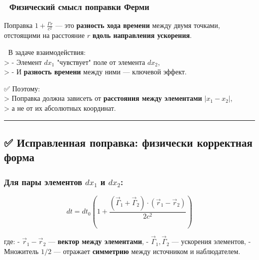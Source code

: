 \documentclass[11pt]{article}
\begin{document}
\subsubsection{🔹 Физический смысл поправки
Ферми}\label{ux444ux438ux437ux438ux447ux435ux441ux43aux438ux439-ux441ux43cux44bux441ux43b-ux43fux43eux43fux440ux430ux432ux43aux438-ux444ux435ux440ux43cux438}

Поправка \(1 + \frac{\Gamma r}{c^2}\) --- это \textbf{разность хода
времени} между двумя точками,\\
отстоящими на расстояние \(r\) \textbf{вдоль направления ускорения}.

📌 В задаче взаимодействия:\\
\textgreater{} - Элемент \(dx_1\) "чувствует" поле от элемента
\(dx_2\),\\
\textgreater{} - И \textbf{разность времени} между ними --- ключевой
эффект.

✅ Поэтому:\\
\textgreater{} Поправка должна зависеть от \textbf{расстояния между
элементами} \(|x_1 - x_2|\),\\
\textgreater{} а не от их абсолютных координат.

\begin{center}\rule{0.5\linewidth}{\linethickness}\end{center}

\subsection{✅ Исправленная поправка: физически корректная
форма}\label{ux438ux441ux43fux440ux430ux432ux43bux435ux43dux43dux430ux44f-ux43fux43eux43fux440ux430ux432ux43aux430-ux444ux438ux437ux438ux447ux435ux441ux43aux438-ux43aux43eux440ux440ux435ux43aux442ux43dux430ux44f-ux444ux43eux440ux43cux430}

\subsubsection{\texorpdfstring{Для пары элементов \(dx_1\) и
\(dx_2\):}{Для пары элементов dx\_1 и dx\_2:}}\label{ux434ux43bux44f-ux43fux430ux440ux44b-ux44dux43bux435ux43cux435ux43dux442ux43eux432-dx_1-ux438-dx_2}

\[
\boxed{
dt = dt_0 \left( 1 + \frac{(\vec{\Gamma}_1 + \vec{\Gamma}_2) \cdot (\vec{r}_1 - \vec{r}_2)}{2c^2} \right)
}
\]

где: - \(\vec{r}_1 - \vec{r}_2\) --- \textbf{вектор между элементами}, -
\(\vec{\Gamma}_1, \vec{\Gamma}_2\) --- ускорения элементов, - Множитель
\(1/2\) --- отражает \textbf{симметрию} между источником и наблюдателем.
\end{document}
